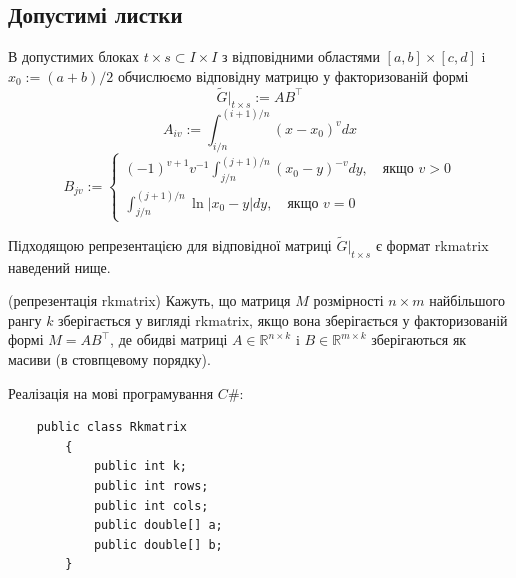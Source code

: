 \documentclass[12pt]{report}
\begin{document}
	\subsection{Допустимі листки}
	\hspace{0.8cm} В допустимих блоках $t\times s\subset I\times I$ з відповідними областями $[a,b]\times [c,d]$ i $x_0:=(a+b)/2$ обчислюємо відповідну матрицю у факторизованій формі
	$$\tilde{G}|_{t\times s}:=AB^\top$$
	$$A_{iv}:=\int_{i/n}^{(i+1)/n}(x-x_0)^vdx$$
	\begin{equation*}
		B_{jv}:=\begin{cases}
					(-1)^{v+1}v^{-1}\int_{j/n}^{(j+1)/n}(x_0-y)^{-v}dy,\quad\text{якщо $v>0$}\\
					\int_{j/n}^{(j+1)/n}\ln|x_0-y|dy,\quad\text{якщо $v=0$}
				\end{cases}
	\end{equation*}
	\par Підходящою репрезентацією для відповідної матриці $\tilde{G}|_{t\times s}$ є формат rkmatrix наведений нище.
	\begin{Def}
		(репрезентація rkmatrix)  Кажуть, що матриця $M$ розмірності $n\times m$ найбільшого рангу $k$ зберігається у вигляді rkmatrix, якщо вона зберігається у факторизованій формі $M=AB^\top$, де обидві матриці $A\in\mathbb{R}^{n\times k}$ i $B\in \mathbb{R}^{m\times k}$ зберігаються як масиви (в стовпцевому порядку).
	\end{Def}
	\par Реалізація на мові програмування $C\#$:
	\begin{verbatim}
	public class Rkmatrix
	    {
	        public int k;
	        public int rows;
	        public int cols;
	        public double[] a;
	        public double[] b;
	    }
	\end{verbatim}
\end{document}
